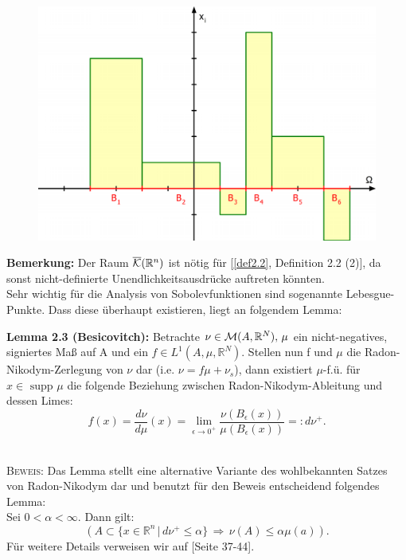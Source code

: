 \begin{figure}[label={fig:boch}, caption={Illustration des Bochner-Integrals \cite{RelaxPaper}}]
    \includegraphics[scale=0.4]{figures/BochnerOhneUrsprungPDF.pdf}
\end{figure}

\textbf{Bemerkung:} Der Raum \(\overline{\mathcal{K}}(\mathbb{R}^n)\) ist nötig für [\ref{def2.2}, Definition 2.2 (2)], da sonst nicht-definierte Unendlichkeitsausdrücke auftreten könnten.\\

Sehr wichtig für die Analysis von Sobolevfunktionen sind sogenannte Lebesgue-Punkte. Dass diese überhaupt existieren, liegt an folgendem Lemma:\\[0.5cm]
\colorbox{generalYellow}{\begin{minipage}{16cm}{\textcolor{black}{}{\label{lem2.3}}}
\textbf{Lemma 2.3 (Besicovitch):} Betrachte \(\nu \in \mathcal{M}(A,\mathbb{R}^N), \, \mu\) ein nicht-negatives, signiertes Maß auf A und ein \(f \in L^1(A,\mu,\mathbb{R}^N)\). Stellen nun f und \(\mu\) die Radon-Nikodym-Zerlegung von \(\nu\) dar (i.e. \(\nu = f\mu + \nu_s\)), dann existiert \(\mu\)-f.ü. für \(x \in \text{ supp }\mu\) die folgende Beziehung zwischen Radon-Nikodym-Ableitung und dessen Limes:
\begin{equation}
    f(x) = \frac{d\nu}{d\mu}(x) = \lim_{\epsilon \to 0^+} \frac{\nu(B_{\epsilon} (x))}{\mu(B_{\epsilon}(x))} =: d\nu^+.
\end{equation}
\end{minipage}}\\

\textsc{Beweis:} Das Lemma stellt eine alternative Variante des wohlbekannten Satzes von Radon-Nikodym dar und benutzt für den Beweis entscheidend folgendes Lemma:\\
Sei \(0 < \alpha < \infty\). Dann gilt:
\begin{equation}
    (A \subset \{x \in \mathbb{R}^n \, | \, d\nu^+ \leq \alpha \} \, \Rightarrow \, \nu(A) \leq \alpha \mu(a)).
\end{equation}
Für weitere Details verweisen wir auf \cite{EvansMeaTh}[Seite 37-44].\QEDB

